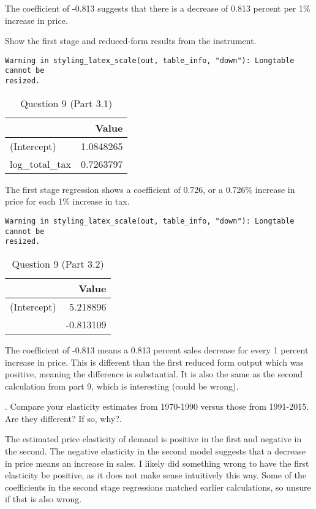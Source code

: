 \documentclass[
  letterpaper,
  DIV=11,
  numbers=noendperiod]{scrartcl}
\begin{document}
The coefficient of -0.813 suggests that there is a decrease of 0.813
percent per 1\% increase in price.

\newpage

 Show the first stage and reduced-form results from the
instrument.

\begin{verbatim}
Warning in styling_latex_scale(out, table_info, "down"): Longtable cannot be
resized.
\end{verbatim}

\begin{longtable}[t]{lr}
\caption{Question 9 (Part 3.1)}\tabularnewline

\toprule
 & Value\\
\midrule
(Intercept) & 1.0848265\\
log\_total\_tax & 0.7263797\\
\bottomrule
\end{longtable}

The first stage regression shows a coefficient of 0.726, or a 0.726\%
increase in price for each 1\% increase in tax.

\begin{verbatim}
Warning in styling_latex_scale(out, table_info, "down"): Longtable cannot be
resized.
\end{verbatim}

\begin{longtable}[t]{lr}
\caption{Question 9 (Part 3.2)}\tabularnewline

\toprule
 & Value\\
\midrule
(Intercept) & 5.218896\\
 & -0.813109\\
\bottomrule
\end{longtable}

The coefficient of -0.813 means a 0.813 percent sales decrease for every
1 percent increase in price. This is different than the first reduced
form output which was positive, meaning the difference is substantial.
It is also the same as the second calculation from part 9, which is
interesting (could be wrong).

\newpage

. Compare your elasticity estimates from 1970-1990 versus
those from 1991-2015. Are they different? If so, why?.

The estimated price elasticity of demand is positive in the first and
negative in the second. The negative elasticity in the second model
suggests that a decrease in price means an increase in sales. I likely
did something wrong to have the first elasticity be positive, as it does
not make sense intuitively this way. Some of the coefficients in the
second stage regressions matched earlier calculations, so unsure if thst
is also wrong.
\end{document}
